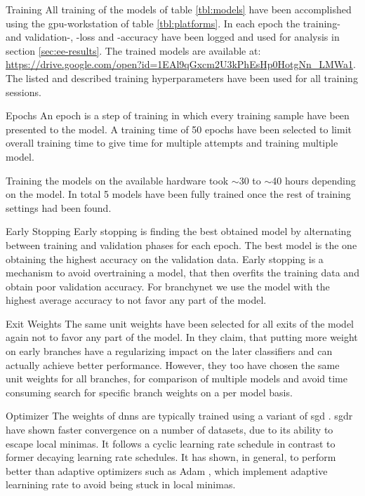\begin{enumdescript}
	\item[Training] All training of the models of table \ref{tbl:models} have been accomplished using the \gls{gpu}-workstation of table \ref{tbl:platforms}. In each epoch the training- and validation-, -loss and -accuracy have been logged and used for analysis in section \ref{sec:ee-results}. The trained models are available at: {\color{sns-grey}\url{https://drive.google.com/open?id=1EAl9qGxcm2U3kPhEsHp0HotgNn_LMWa1}}.
	The listed and described training hyperparameters have been used for all training sessions. 
	
	\begin{enumdescript}
		\item[Epochs] An epoch is a step of training in which every training sample have been presented to the model. A training time of 50 epochs have been selected to limit overall training time to give time for multiple attempts and training multiple model.
		
		Training the models on the available hardware took $\sim$30 to  $\sim$40 hours depending on the model. In total 5 models have been fully trained once the rest of training settings had been found.
		
		\item[Early Stopping] Early stopping is finding the best obtained model by alternating between training and validation phases for each epoch. The best model is the one obtaining the highest accuracy on the validation data. Early stopping is a mechanism to avoid overtraining a model, that then overfits the training data and obtain poor validation accuracy. For \gls{branchynet} we use the model with the highest average accuracy to not favor any part of the model.  
		
		\item[Exit Weights] The same unit weights have been selected for all exits of the model again not to favor any part of the model. In \cite{teerapittayanon_branchynet:_2016} they claim, that putting more weight on early branches have a regularizing impact on the later classifiers and can actually achieve better performance. However, they too have chosen the same unit weights for all branches, for comparison of multiple models and avoid time consuming search for specific branch weights on a per model basis.
		
		\item[Optimizer] The weights of \gls{dnn}s are typically trained using a variant of \gls{sgd} \cite{goodfellow_deep_2016}. \gls{sgdr} \cite{loshchilov_sgdr:_2016} have shown faster convergence on a number of datasets, due to its ability to escape local minimas. It follows a cyclic learning rate schedule in contrast to former decaying learning rate schedules. It has shown, in general, to perform better than adaptive optimizers such as Adam \cite{kingma_adam:_2014}, which implement adaptive learnining rate to avoid being stuck in local minimas. 
		

\end{enumdescript}
\end{enumdescript}
